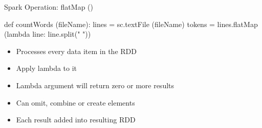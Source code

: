\documentclass[aspectratio=169]{beamer}
\begin{document}
\begin{frame}[fragile]{Spark Operation: flatMap ()}

\begin{SQL}
def countWords (fileName):
     lines = sc.textFile (fileName)
     tokens = lines.flatMap (lambda line: line.split(" "))
\end{SQL}

\begin{itemize}
\item Processes every data item in the RDD
\item Apply lambda to it
\item Lambda argument will return zero or more results
\item Can omit, combine or create elements
\item Each result added into resulting RDD
\end{itemize}
\end{frame}
\end{document}
